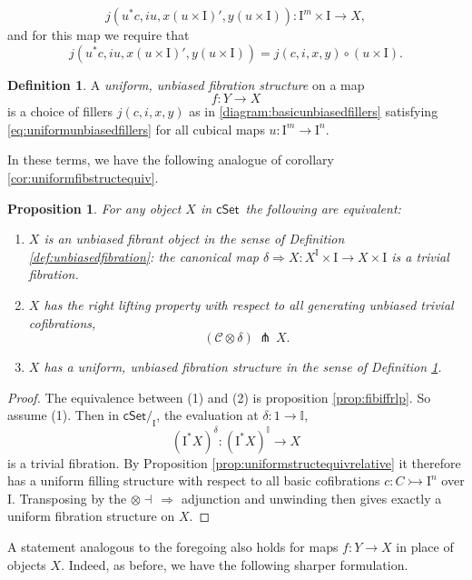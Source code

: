 \documentclass[11pt,reqno]{amsart}
\newcommand{\cSet}{\ensuremath{\mathsf{cSet}}}
\newcommand{\mono}{\ensuremath{\rightarrowtail}}
\newcommand{\ra}{\ensuremath{\rightarrow}}
\renewcommand{\to}{\ensuremath{\rightarrow}}
\newcommand{\too}{\ensuremath{\longrightarrow}}
\newcommand{\I}{\ensuremath{\mathrm{I}}}
\newcommand{\II}{\ensuremath{\mathbb{I}}}
\newtheorem{proposition}[theorem]{Proposition}
\theoremstyle{remark}
\theoremstyle{definition}
\newtheorem{definition}[theorem]{Definition}
\begin{document}
\[
j(u^*c,iu,x(u\times \I)', y(u\times \I)): \I^m\times\I\ra X,
\]
 and for this map we require that
\begin{equation}\label{eq:uniformunbiasedfillers}
j(u^*c,iu,x(u\times \I)', y(u\times \I)) = j(c,i,x,y)\circ (u\times \I).
\end{equation}

\begin{definition}\label{def:unbiasedfibstructure} A \emph{uniform, unbiased fibration structure} on a map 
\[
f: Y\ra X
\]
 is a choice of fillers $j(c,i,x,y)$ as in \eqref{diagram:basicunbiasedfillers} satisfying \eqref{eq:uniformunbiasedfillers} for all cubical maps $u : \I^m\to\I^n$.
\end{definition}

In these terms, we have the following analogue of corollary \ref{cor:uniformfibstructequiv}.

\begin{proposition}\label{prop:equivfibstruc} For any object $X$ in \cSet\ the following are equivalent:
\begin{enumerate}
\item $X$ is an unbiased fibrant object in the sense of Definition \ref{def:unbiasedfibration}: the canonical map $\delta\Rightarrow X : X^\I\times \I \ra X\times \I$ is a trivial fibration. 

\item $X$ has the right lifting property with respect to all generating unbiased trivial cofibrations,
\[
(\mathcal{C}\otimes\delta)\, \pitchfork\,X.
\]

\item $X$ has a uniform, unbiased fibration structure in the sense of Definition \ref{def:unbiasedfibstructure}.
\end{enumerate}
\end{proposition}

\begin{proof}
The equivalence between (1) and (2) is proposition \ref{prop:fibiffrlp}.  
So assume (1).
Then in $\cSet/_\I$, the evaluation at $\delta : 1\to\II$,
\[
(\I^*X)^\delta : (\I^*X)^\II \too X
\]
is a trivial fibration.  By Proposition \ref{prop:uniformstructequivrelative} it therefore 
has a uniform filling structure with respect to all basic cofibrations $c :C\mono \I^n$ over $\I$.  Transposing by the $\otimes\dashv\,\Rightarrow$ adjunction and unwinding then gives exactly a uniform fibration structure on $X$.
\end{proof}

A statement analogous to the foregoing also holds for maps $f:Y\ra X$ in place of objects $X$.  Indeed, as before, we have the following sharper formulation.
\end{document}
